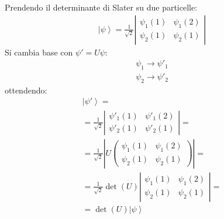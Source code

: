 Prendendo il determinante di Slater su due particelle:
\begin{equation}\begin{split}
\left |\psi  \right\rangle=\frac{1}{\sqrt{2}}\left|\begin{matrix}
\psi _1\left(1\right)&\psi _1\left(2\right)\\
\psi _2\left(1\right)&\psi _2\left(1\right)
\end{matrix}\right|
\end{split}\end{equation}
Si cambia base con $\psi '=U\psi $:
\begin{equation}\begin{split}
\psi _1\to \psi '_1\\
\psi _2\to \psi '_2
\end{split}\end{equation}
ottendendo:
\begin{equation}\begin{split}
\left |\psi ' \right\rangle=\\
=\frac{1}{\sqrt{2}}\left|\begin{matrix}
\psi' _1\left(1\right)&\psi' _1\left(2\right)\\
\psi' _2\left(1\right)&\psi' _2\left(1\right)
\end{matrix}\right|=\\
=\frac{1}{\sqrt{2}}\left|U\left(\begin{matrix}
\psi _1\left(1\right)&\psi _1\left(2\right)\\
\psi _2\left(1\right)&\psi _2\left(1\right)
\end{matrix}\right)\right|=\\
=\frac{1}{\sqrt{2}}\det{\left(U\right)}\left|\begin{matrix}
\psi _1\left(1\right)&\psi _1\left(2\right)\\
\psi _2\left(1\right)&\psi _2\left(1\right)
\end{matrix}\right|=\\
=\det{\left(U\right)}\left |\psi  \right\rangle
\end{split}\end{equation}


